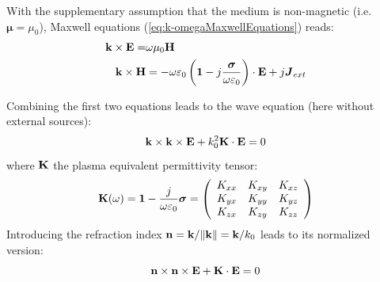 With the supplementary assumption that the medium is non-magnetic (i.e. $\boldsymbol{\mu}=\mu_0$), Maxwell equations (\ref{eq:k-omegaMaxwellEquations}) reads:
\begin{subequations}
	\begin{align}
		{\mathbf k} \times {\mathbf E}  
		=& 
		\omega \mu_0 {\mathbf H}
		\\
		{\mathbf k} \times {\mathbf H} 
		&=
		-\omega \varepsilon_0
		\left(
		\boldsymbol{1}
		- 	
		j\frac{\boldsymbol{\sigma}}{\omega \varepsilon_0} 
		\right) \cdot 
		{\mathbf E} + j \boldsymbol{J}_{ext}
	\end{align}
	\label{eq:maxwell_equations_kspace}
\end{subequations}

Combining the first two equations leads to the wave equation (here without external sources):
\begin{equation}
{\mathbf k} \times {\mathbf k} \times {\mathbf E} + k_0^2 {\mathbf K} \cdot {\mathbf E} = 0
\label{eq:wave_equation_kxkxE}
\end{equation}
where ${\mathbf K}$ the plasma equivalent permittivity tensor:
\begin{equation}
{\mathbf K}(\omega) =  
\boldsymbol{1} - \frac{j}{\omega \varepsilon_0} \boldsymbol{\sigma}
=
\left(
\begin{array}{ccc}
K_{xx} & K_{xy} & K_{xz} \\
K_{yx} & K_{yy} & K_{yz} \\
K_{zx} & K_{zy} & K_{zz} \\
\end{array}
\right)
\end{equation}  
Introducing the refraction index ${\mathbf n} = {\mathbf k} / \norm{{\mathbf k}} = {\mathbf k}/k_0$ leads to its normalized version:
\begin{equation}
{\mathbf n} \times {\mathbf n} \times {\mathbf E} + {\mathbf K} \cdot {\mathbf E} = 0
\label{eq:wave_equation_nxnxE}
\end{equation}



